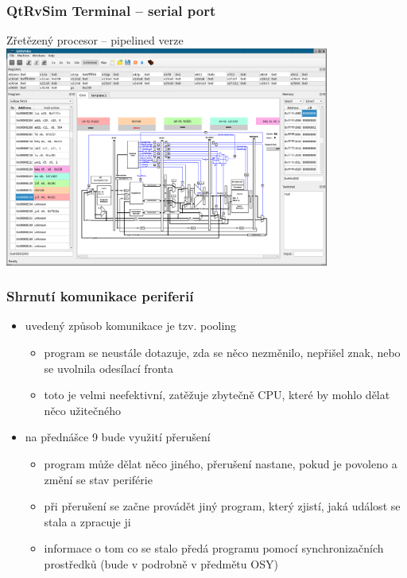 \documentclass{beamer}
\begin{document}
\begin{frame}
\frametitle{QtRvSim Terminal -- serial port}
\begin{center}
Zřetězený procesor -- pipelined verze
\includegraphics[width=0.8\textwidth]{fig/QtRvSim-serial-pipeline.png}
\end{center}
\end{frame}

\begin{frame}
\frametitle{Shrnutí komunikace periferií}

\begin{itemize}
\item uvedený způsob komunikace je tzv. pooling
\begin{itemize}
\item program se neustále dotazuje, zda se něco nezměnilo, nepřišel znak, nebo se uvolnila odesílací fronta
\item toto je velmi neefektivní, zatěžuje zbytečně CPU, které by mohlo dělat něco užitečného
\end{itemize}
\item na přednášce 9 bude využití přerušení
\begin{itemize}
\item program může dělat něco jiného, přerušení nastane, pokud je povoleno a změní se stav periférie
\item při přerušení se začne provádět jiný program, který zjistí, jaká událost se stala a zpracuje ji
\item informace o tom co se stalo předá programu pomocí synchronizačních prostředků (bude v podrobně v předmětu OSY)
\end{itemize}
\end{itemize}

\end{frame}
\end{document}
